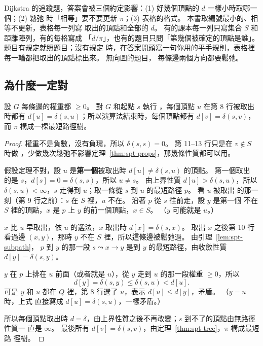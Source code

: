 \begin{examnote}
Dijkstra 的追蹤題，答案會被三個約定影響：(1) 好幾個頂點的 $d$ 一樣小時取哪一個；(2) 鬆弛
時「相等」要不要更新 $\pi$；(3) 表格的格式。 本書取編號最小的、相等不更新，表格每一列寫
取出的頂點和全部的 $d$。 有的課本每一列只寫集合 $S$ 和距離陣列，有的每格寫成
「$d/\pi$」，也有的題目只問「第幾個被確定的頂點是誰」。 題目有規定就照題目；沒有規定
時，在答案開頭寫一句你用的平手規則，表格裡每一輪都把取出的頂點標出來。 無向圖的題目，
每條邊兩個方向都要鬆弛。
\end{examnote}

\subsection{為什麼一定對}

\begin{theorem}
\label{thm:spt-dijkstra}
設 $G$ 每條邊的權重都 $\ge 0$。 對 $G$ 和起點 $s$ 執行 ，每個頂點 $u$ 在第
8 行被取出時都有 $d[u] = \delta(s, u)$；所以演算法結束時，每個頂點都有 $d[v] = \delta(s,
v)$，而 $\pi$ 構成一棵最短路徑樹。
\end{theorem}

\begin{proof}
權重不是負數，沒有負環，所以 $\delta(s, s) = 0$。 第 11--13 行只是在 $v \notin S$ 時做
，少做幾次鬆弛不影響定理~\ref{thm:spt-props}，那幾條性質都可以用。

假設定理不對，設 $u$ 是\textbf{第一個}被取出時 $d[u] \ne \delta(s, u)$ 的頂點。 第一個取出
的是 $s$，$d[s] = 0 = \delta(s, s)$，所以 $u \ne s$。 由上界性質 $d[u] > \delta(s, u)$，所以
$\delta(s, u) < \infty$，$s$ 走得到 $u$；取一條從 $s$ 到 $u$ 的最短路徑 $p$。 看 $u$ 被取出
的那一刻（第 9 行之前）：$s$ 在 $S$ 裡，$u$ 不在。 沿著 $p$ 從 $s$ 往前走，設 $y$ 是第一個
不在 $S$ 裡的頂點，$x$ 是 $p$ 上 $y$ 的前一個頂點，$x \in S$。 （$y$ 可能就是 $u$。）

$x$ 比 $u$ 早取出，依 $u$ 的選法，$x$ 取出時 $d[x] = \delta(s, x)$。 取出 $x$ 之後第 10
行看過邊 $(x, y)$，那時 $y$ 不在 $S$ 裡，所以這條邊被鬆弛過。 由引理~\ref{lem:spt-subpath}，
$p$ 到 $y$ 的那一段 $s \leadsto x \to y$ 是到 $y$ 的最短路徑，由收斂性質
$d[y] = \delta(s, y)$。

$y$ 在 $p$ 上排在 $u$ 前面（或者就是 $u$），從 $y$ 走到 $u$ 的那一段權重 $\ge 0$，所以
\[
d[y] = \delta(s, y) \le \delta(s, u) < d[u].
\]
可是 $y$ 和 $u$ 都在 $Q$ 裡，第 8 行選了 $u$，表示 $d[u] \le d[y]$，矛盾。 （$y = u$ 時，上式
直接寫成 $d[u] = \delta(s, u)$，一樣矛盾。）

所以每個頂點取出時 $d = \delta$，由上界性質之後不再改變；$s$ 到不了的頂點由無路徑性質一
直是 $\infty$。 最後所有 $d[v] = \delta(s, v)$，由定理~\ref{thm:spt-tree}，$\pi$ 構成最短路
徑樹。
\end{proof}

